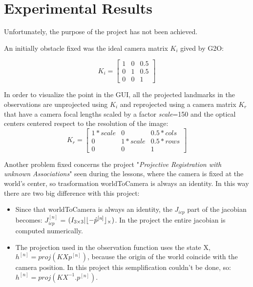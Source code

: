 \documentclass[10pt]{article}
\DeclarePairedDelimiter\floor{\lfloor}{\rfloor}
\begin{document}
	\section{Experimental Results}	
	Unfortunately, the purpose of the project has not been achieved. 
	
	An initially obstacle fixed was the ideal camera matrix $K_i$ gived by G2O: 
	
	\[
	K_i =
	\begin{bmatrix}
   		1 & 0 & 0.5\\
   		0 & 1 & 0.5\\
   		0 & 0 &  1
	\end{bmatrix}
	\]
	
	In order to visualize the point in the GUI, all the projected landmarks in the observations are unprojected using $K_i$ and reprojected using a camera matrix $K_r$ that have a camera focal lengths scaled by a factor \textit{scale}=150 and the optical centers centered respect to the resolution of the image:
		\[
	K_r =
	\begin{bmatrix}
   		1*scale & 0 & 0.5*cols\\
   		0 & 1*scale & 0.5*rows\\
   		0 & 0 &  1
	\end{bmatrix}
	\]
	
	Another problem fixed concerns the project "\textit{Projective Registration with unknown Associations}" seen during the lessons, where the camera is fixed at the world's center, so trasformation worldToCamera is always an identity.
In this way there are two big difference with this project:
		\begin{itemize}
			\item  Since that worldToCamera is always an identity, the $J_{icp}$ part of the jacobian becomes: $J_{icp}^{[\textit{n}]}$ = $(I_{3\times 3} | \floor{- \hat{p}^{[\textit{n}]} }_{\times})$.
			In the project the entire jacobian is computed numerically.			

			\item The projection used in the observation function uses the state X,	$h^{[\textit{n}]} = proj(K X p^{[\textit{n}]})$, because the origin of the world coincide with the camera position. In this project this semplification couldn't be done, so: $h^{[\textit{n}]} = proj(K X^{-1}. p^{[\textit{n}]})$.

		\end{itemize}
	

	
	
\end{document}
